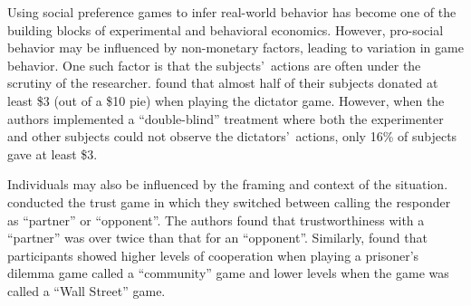 \documentclass[12pt]{article}
\begin{document}

Using social preference games to infer real-world behavior has become one of the building blocks of experimental and behavioral economics. However, pro-social behavior may be influenced by non-monetary factors, leading to variation in game behavior. One such factor is that the subjects\rq \ actions are often under the scrutiny of the researcher. \cite{hoffman_1994} found that almost half of their subjects donated at least \$3 (out of a \$10 pie) when playing the dictator game. However, when the authors implemented a ``double-blind'' treatment where both the experimenter and other subjects could not observe the dictators\rq \ actions, only 16\% of subjects gave at least \$3.

Individuals may also be influenced by the framing and context of the situation. \cite{burnham_mccabe_smith_2000} conducted the trust game in which they switched between calling the responder as ``partner'' or ``opponent''. The authors found that trustworthiness with a ``partner'' was over twice than that for an ``opponent''. Similarly, \cite{ross_ward_1996} found that participants showed higher levels of cooperation when playing a prisoner\rq s dilemma game called a ``community'' game and lower levels when the game was called a ``Wall Street'' game. 

\end{document}
